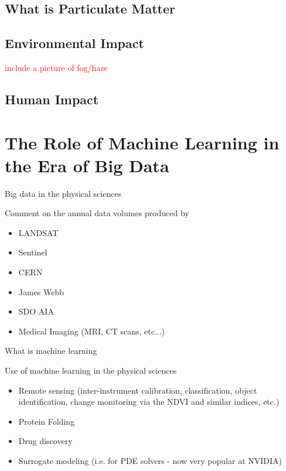 \subsection{What is Particulate Matter}

\subsection{Environmental Impact}

\textcolor{red}{include a picture of fog/haze}

\subsection{Human Impact}







\section{The Role of Machine Learning in the Era of Big Data}

Big data in the physical sciences

Comment on the annual data volumes produced by
\begin{itemize}
  \item LANDSAT
  \item Sentinel
  \item CERN
  \item James Webb
  \item SDO AIA
  \item Medical Imaging (MRI, CT scans, etc...)
\end{itemize}

What is machine learning

Use of machine learning in the physical sciences

\begin{itemize}
  \item Remote sensing (inter-instrument calibration, classification, object identification, change monitoring via the NDVI and similar indices, etc.)
  \item Protein Folding
  \item Drug discovery
  \item Surrogate modeling (i.e. for PDE solvers - now very popular at NVIDIA)
\end{itemize}




